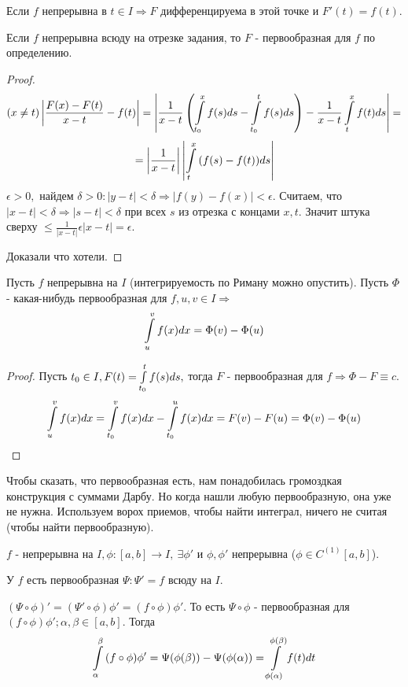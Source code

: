 \documentclass[12pt]{report}
\begin{document}
\begin{thm}
Если $f$ непрерывна в $t \in I \Rightarrow F$ дифференцируема в этой точке и $F'(t) = f(t)$. 
\end{thm}

\begin{cor}
Если $f$ непрерывна всюду на отрезке задания, то $F$ - первообразная для $f$ по определению.
\end{cor}

\begin{proof}
$$ (x \neq t) \left|\frac{F(x) - F(t)}{x - t} - f(t)\right| = \left|\frac{1}{x - t}\left(\int\limits_{t_0}^x{f(s)ds} - \int\limits_{t_0}^t{f(s)ds}\right) - \frac{1}{x - t}\int\limits_{t}^x{f(t)ds}\right| =$$ $$= \left|\frac{1}{x - t}\right|\left|\int\limits_t^x{(f(s) - f(t))ds}\right|$$
$\epsilon > 0,$ найдем $\delta > 0: |y - t|< \delta \Rightarrow |f(y) - f(x)| < \epsilon$. Считаем, что $|x - t| < \delta \Rightarrow |s - t| < \delta$ при всех $s$ из отрезка с концами $x, t$.
Значит штука сверху $\le \frac{1}{|x - t|}\epsilon |x - t| = \epsilon$.

Доказали что хотели.
\end{proof}

\begin{cor}
Пусть $f$ непрерывна на $I$ (интегрируемость по Риману можно опустить). Пусть $\Phi$ - какая-нибудь первообразная для $f, u, v \in I \Rightarrow$
$$\int\limits_u^v{f(x)dx} = \Phi(v) - \Phi(u)$$
\end{cor}
\begin{proof}
Пусть $t_0 \in I, F(t) = \int\limits_{t_0}^t{f(s)ds},$ тогда $F$ - первообразная для $f \Rightarrow \Phi - F \equiv c$.
$$\int\limits_u^v{f(x)dx} = \int\limits_{t_0}^v{f(x)dx} - \int\limits_{t_0}^u{f(x)dx} = F(v) - F(u) = \Phi(v) - \Phi(u)$$
\end{proof}

\begin{rem}
Чтобы сказать, что первообразная есть, нам понадобилась громоздкая конструкция с суммами Дарбу. Но когда нашли любую первообразную, она уже не нужна. Используем ворох приемов, чтобы найти интеграл, ничего не считая (чтобы найти первообразную).
\end{rem}

\begin{st}
$f$ - непрерывна на $I, \phi: [a, b] \to I, ~\exists \phi'$ и $\phi, \phi'$ непрерывна ($\phi \in C^{(1)}[a, b]$).

У $f$ есть первообразная $\Psi: \Psi' = f$ всюду на $I$.

$(\Psi \circ \phi)' = (\Psi' \circ \phi) \phi' = (f \circ \phi)\phi'$. То есть $\Psi \circ \phi$ - первообразная для $(f \circ \phi) \phi'; \alpha, \beta \in [a, b]$. Тогда
$$\int\limits_\alpha^\beta{(f \circ \phi)\phi'} = \Psi(\phi(\beta)) - \Psi(\phi(\alpha)) = \int\limits_{\phi(\alpha)}^{\phi(\beta)}{f(t)dt}$$
\end{st}
\end{document}
